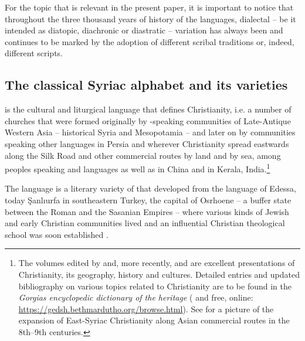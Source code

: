 \documentclass[output=paper,colorlinks,citecolor=brown,arabfont,syriacfont]{langscibook}
\begin{document}
For the topic that is relevant in the present paper, it is important to notice that throughout the three thousand years of history of the  languages, dialectal -- be it intended as diatopic, diachronic or diastratic -- variation has always been and continues to be marked by the adoption of different scribal traditions or, indeed, different scripts. 

    \subsection{The classical Syriac alphabet and its varieties}\label{ch.3.6.ss.1.2}


 is the cultural and liturgical language that defines  Christianity, i.e. a number of churches that were formed originally by -speaking communities of Late-Antique Western Asia -- historical Syria and Mesopotamia -- and later on by communities speaking other languages in Persia and wherever Christianity spread eastwards along the Silk Road and other commercial routes by land and by sea, among peoples speaking  and  languages as well as  in China and  in Kerala, India.\footnote{%
The volumes edited by \citet{brock_taylor2001} and, more recently, \citet{king2020} and \citet{briquel_chatonnet_debie2023} are excellent presentations of  Christianity, its geography, history and cultures. Detailed entries and updated bibliography on various topics related to  Christianity are to be found in the \textit{Gorgias encyclopedic dictionary of the  heritage} (\citealt{brock_et_al_2011} and free, online: \url{https://gedsh.bethmardutho.org/browse.html}). See \citet{berti2011} for a picture of the expansion of East-Syriac Christianity along Asian commercial routes in the 8th--9th centuries.}

The language is a literary variety of  that developed from the  language of Edessa, today Şanlıurfa in southeastern Turkey, the capital of Osrhoene -- a buffer state between the Roman and the Sasanian Empires -- where various kinds of Jewish and early Christian communities lived and an influential Christian theological school was soon established \citep{harrak2011}. 
\end{document}
